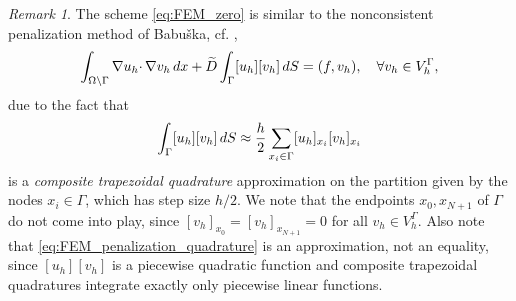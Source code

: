 \documentclass{article}
\theoremstyle{remark}
\newtheorem{remark}{Remark}
\def \d {{\rm d}}
\def\dx{\,\d x }
\def\dS{\,\d S }
\def\tD{\widetilde{D}}
\begin{document}
\begin{remark}
\label{rem:quadrature}
The scheme \eqref{eq:FEM_zero} is similar to the nonconsistent penalization method of Babu\v{s}ka, cf. \cite{Babuska:1973:FEM},
\begin{equation}
\label{eq:FEM_penalization}
\int_{\Omega\setminus\Gamma} \nabla u_h\cdotp\nabla v_h \dx +\tD\int_\Gamma[u_h][v_h]\dS =(f,v_h),\quad\forall v_h\in V_h^\Gamma,
\end{equation}
due to the fact that
\begin{equation}
\label{eq:FEM_penalization_quadrature}
\int_\Gamma[u_h][v_h]\dS\approx \frac{h}{2}\sum_{x_i\in\Gamma}[u_h]_{x_i}[v_h]_{x_i}
\end{equation}
is a \emph{composite trapezoidal quadrature} approximation on the partition given by the nodes $x_i\in\Gamma$, which has step size $h/2$. We note that the endpoints $x_0,x_{N+1}$ of $\Gamma$ do not come into play, since  $[v_h]_{x_0}=[v_h]_{x_{N+1}}=0$ for all $v_h\in V_h^\Gamma$. Also note that \eqref{eq:FEM_penalization_quadrature} is an approximation, not an equality, since $[u_h][v_h]$ is a piecewise quadratic function and composite trapezoidal quadratures integrate exactly only piecewise linear functions.
\end{remark}
\end{document}
